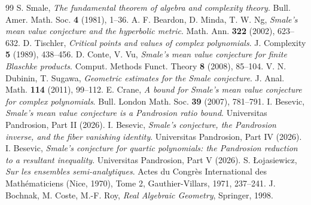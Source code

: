 \documentclass[11pt,a4paper]{article}
\begin{document}
\begin{thebibliography}{99}
 S. Smale, \textit{The fundamental theorem of algebra and complexity theory}. Bull. Amer. Math. Soc. \textbf{4} (1981), 1--36.
 A. F. Beardon, D. Minda, T. W. Ng, \textit{Smale's mean value conjecture and the hyperbolic metric}. Math. Ann. \textbf{322} (2002), 623--632.
 D. Tischler, \textit{Critical points and values of complex polynomials}. J. Complexity \textbf{5} (1989), 438--456.
 D. Conte, V. Vu, \textit{Smale's mean value conjecture for finite Blaschke products}. Comput. Methods Funct. Theory \textbf{8} (2008), 85--104.
 V. N. Dubinin, T. Sugawa, \textit{Geometric estimates for the Smale conjecture}. J. Anal. Math. \textbf{114} (2011), 99--112.
 E. Crane, \textit{A bound for Smale's mean value conjecture for complex polynomials}. Bull. London Math. Soc. \textbf{39} (2007), 781--791.
 I. Besevic, \textit{Smale's mean value conjecture is a Pandrosion ratio bound}. Universitas Pandrosion, Part II (2026).
 I. Besevic, \textit{Smale's conjecture, the Pandrosion inverse, and the fiber vanishing identity}. Universitas Pandrosion, Part IV (2026).
 I. Besevic, \textit{Smale's conjecture for quartic polynomials: the Pandrosion reduction to a resultant inequality}. Universitas Pandrosion, Part V (2026).
 S. \L{}ojasiewicz, \textit{Sur les ensembles semi-analytiques}. Actes du Congr\`es International des Math\'ematiciens (Nice, 1970), Tome 2, Gauthier-Villars, 1971, 237--241.
 J. Bochnak, M. Coste, M.-F. Roy, \textit{Real Algebraic Geometry}, Springer, 1998.
\end{thebibliography}
\end{document}
